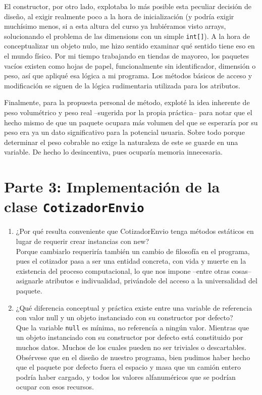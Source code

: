 \documentclass{article}
\begin{document}
		El constructor, por otro lado, explotaba lo más posible esta peculiar decisión de
		diseño, al exigir realmente poco a la hora de inicialización (y podría exigir
		muchísimo menos, si a esta altura del curso ya hubiéramos visto arrays, solucionando
		el problema de las dimensions con un simple \texttt{int[]}). A la hora de
		conceptualizar un objeto nulo, me hizo sentido examinar qué sentido tiene eso en el
		mundo físico. Por mi tiempo trabajando en tiendas de mayoreo, los paquetes vacíos
		existen como hojas de papel, funcionalmente sin identificador, dimensión o peso, así
		que apliqué esa lógica a mi programa. Los métodos básicos de acceso y modificación
		se siguen de la lógica rudimentaria utilizada para los atributos.

		Finalmente, para la propuesta personal de método, exploté la idea inherente de peso
		volumétrico y peso real --sugerida por la propia práctica-- para notar que el hecho
		mismo de que un paquete ocupara más volumen del que se esperaría por su peso era ya
		un dato significativo para la potencial usuaria. Sobre todo porque determinar el
		peso cobrable no exige la naturaleza de este se guarde en una variable. De hecho lo
		desincentiva, pues ocuparía memoria innecesaria.
	\section*{Parte 3: Implementación de la clase \texttt{CotizadorEnvio}}
		\begin{enumerate}
			\item ¿Por qué resulta conveniente que CotizadorEnvio tenga métodos estáticos 
				en lugar de requerir crear instancias con new? \\
				Porque cambiarlo requeriría también un cambio de filosofía en el
				programa, pues el cotizador pasa a ser una entidad concreta, con
				vida y muerte en la existencia del proceso computacional, lo que nos
				impone --entre otras cosas-- asignarle atributos e indivualidad,
				privándole del acceso a la universalidad del paquete.
			\item ¿Qué diferencia conceptual y práctica existe entre una variable de
				referencia con valor null y un objeto instanciado con su constructor
				por defecto? \\
				Que la variable \texttt{null} es mínima, no referencía a ningún
				valor. Mientras que un objeto instanciado con su constructor
				por defecto está constituido por muchos datos. Muchos de los cuales
				pueden no ser triviales o descartables. Obsérvese que en el diseño
				de nuestro programa, bien pudimos haber hecho que el paquete por
				defecto fuera el espacio y masa que un camión entero podría haber
				cargado, y todos los valores alfanuméricos que se podrían ocupar con
				esos recursos.
		\end{enumerate}
\end{document}
